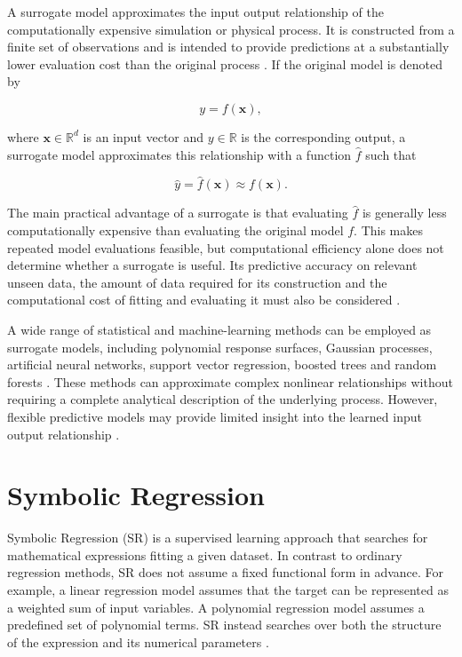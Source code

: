 \documentclass[12pt,oneside,bibtotoc,liststotoc]{scrbook}
\begin{document}
A surrogate model approximates the input output relationship of the computationally expensive simulation or physical process. It is constructed from a finite set of observations and is intended to provide predictions at a substantially lower evaluation cost than the original process \cite{alizadeh2020managing}. If the original model is denoted by

\begin{equation}
    y = f(\mathbf{x}),
\end{equation}

where $\mathbf{x} \in \mathbb{R}^{d}$ is an input vector and $y \in \mathbb{R}$ is the corresponding output, a surrogate model approximates this relationship with a function $\hat{f}$ such that

\begin{equation}
    \hat{y} = \hat{f}(\mathbf{x}) \approx f(\mathbf{x}).
\end{equation}

The main practical advantage of a surrogate is that evaluating $\hat{f}$ is generally less computationally expensive than evaluating the original model $f$. This makes repeated model evaluations feasible, but computational efficiency alone does not determine whether a surrogate is useful. Its predictive accuracy on relevant unseen data, the amount of data required for its construction and the computational cost of fitting and evaluating it must also be considered \cite{alizadeh2020managing}.

A wide range of statistical and machine-learning methods can be employed as surrogate models, including polynomial response surfaces, Gaussian processes, artificial neural networks, support vector regression, boosted trees and random forests \cite{alizadeh2020managing}. These methods can approximate complex nonlinear relationships without requiring a complete analytical description of the underlying process. However, flexible predictive models may provide limited insight into the learned input output relationship \cite{makke2024interpretable}.

\section{Symbolic Regression}

Symbolic Regression (SR) is a supervised learning approach that searches for mathematical expressions fitting a given dataset. In contrast to ordinary regression methods, SR does not assume a fixed functional form in advance. For example, a linear regression model assumes that the target can be represented as a weighted sum of input variables. A polynomial regression model assumes a predefined set of polynomial terms. SR instead searches over both the structure of the expression and its numerical parameters \cite{angelis2023artificial,lacava2021contemporary}.
\end{document}
